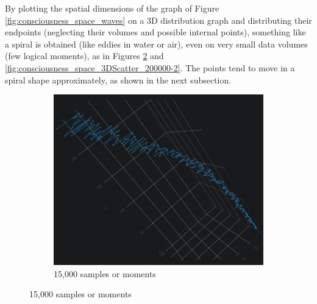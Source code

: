 By plotting the spatial dimensions of the graph of Figure \ref{fig:consciousness_space_waves} on a 3D distribution graph and distributing their endpoints (neglecting their volumes and possible internal points), something like a spiral is obtained (like eddies in water or air), even on very small data volumes (few logical moments), as in Figures \ref{fig:consciousness_space_3DScatter15000-10} and \ref{fig:consciousness_space_3DScatter_200000-2}. The points tend to move in a spiral shape approximately, as shown in the next subsection.
	\begin{figure}[H]
	\centering
		\begin{subfigure}[H]{0.47\linewidth}
		\centering
		\includegraphics[width=1\linewidth]{sections/images/consciousness_space_3DScatter15000-10.jpg}
		\caption{15,000 samples or moments}
		\label{fig:consciousness_space_3DScatter15000-10}
		\end{subfigure}
	

\end{figure}
